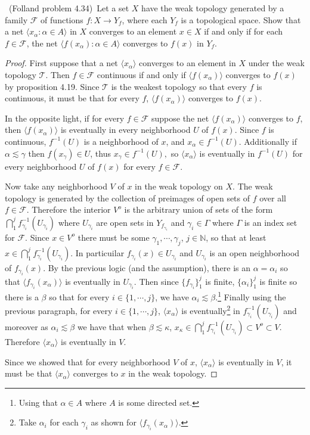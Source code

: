 \documentclass[11pt]{amsart}
\theoremstyle{definition}
\numberwithin{theorem}{section}
\numberwithin{definition}{section}
\numberwithin{equation}{section}
\newcommand{\abr}[1]{ \langle  #1 \rangle}
\def\scriptf{{\mathcal F}}
\def\scriptt{{\mathcal T}}
\begin{document}
\medskip {}\ (Folland problem 4.34)\ 
Let a set $X$ have the weak topology generated by a family $\scriptf$
of functions $f:X\to Y_f$, where each $Y_f$ is a topological space.
Show that a net $\abr{x_\alpha: \alpha\in A}$ in $X$ converges to an element $x\in X$
if and only if for each $f\in\scriptf$,
the net $\abr{f(x_\alpha): \alpha\in A}$ converges to $f(x)$ in $Y_f$.
\begin{proof}
	First suppose that a net $\abr{x_\alpha}$ converges to an element in $X$ under the weak topology $\scriptt$.
	Then $f \in \scriptf$ continuous if and only if $\abr{f(x_\alpha)}$ converges to $f(x)$ by proposition 4.19. Since
	$\scriptt$ is the weakest topology so that every $f$ is continuous, it must be that for every $f$, $\abr{f(x_\alpha)}$
	converges to $f(x).$

	In the opposite light, if for every $f \in \scriptf$ suppose the net $\abr{f(x_\alpha)}$ converges to $f$, then $\abr{f(x_\alpha)}$ is eventually in every neighborhood $U$ of $f(x).$ Since $f$ is continuous, $f^{-1}(U)$ is a neighborhood of $x$, and $x_\alpha \in f^{-1}(U)$. Additionally if $\alpha \lesssim \gamma$ then $f(x_\gamma) \in U$, thus $x_\gamma \in f^{-1}(U),$ so $\abr{x_\alpha}$ is eventually in $f^{-1}(U)$ for every neighborhood $U$ of $f(x)$ for every $f \in \scriptf$. 

	Now take any neighborhood $V$ of $x$ in the weak topology on $X$. The weak topology is generated by the collection of preimages of open sets of $f$ over all $f \in \scriptf$. Therefore the interior $V^o$ is the arbitrary union of sets of the form $\bigcap_{1}^j f_{\gamma_i}^{-1}(U_{\gamma_i})$ where $U_{\gamma_i}$ are open sets in $Y_{f_{\gamma_i}}$ and $\gamma_i \in \Gamma$ where $\Gamma$ is an index set for $\scriptf$. Since $x \in V^o$ there must be some $\gamma_1, \cdots, \gamma_j$, $j\in\mathbb{N}$, so that at least $x \in \bigcap_{1}^j  f_{\gamma_i}^{-1}(U_{\gamma_i}).$ In particuilar $f_{\gamma_i}(x) \in U_{\gamma_i}$ and $U_{\gamma_i}$ is an open neighborhood of $f_{\gamma_i}(x).$ By the previous logic (and the assumption), there is an $\alpha = \alpha_i$ so that $\abr{f_{\gamma_i}(x_\alpha)}$ is eventually in $U_{\gamma_i}.$ Then since $\{f_{\gamma_i}\}_1^j$ is finite, $\{\alpha_i\}_1^j$ is finite so there is a $\beta$ so that for every $i \in \{1, \cdots, j\}$, we have $\alpha_i \lesssim \beta.$\footnote{Using that $\alpha \in A$ where $A$ is some directed set.} Finally using the previous paragraph, for every $i\in \{1, \cdots, j\}$, $\abr{x_{\alpha}}$ is eventually\footnote{Take $\alpha_i$ for each $\gamma_i$ as shown for $\abr{f_{\gamma_i}(x_\alpha)}$.}  in $f_{\gamma_i}^{-1}(U_{\gamma_i})$ and moreover as $\alpha_i \lesssim \beta$ we have that when $\beta \lesssim \kappa$, $x_\kappa \in \bigcap_1^j f^{-1}_{\gamma_i}(U_{\gamma_i}) \subset V^o \subset V$. Therefore $\abr{x_\alpha}$ is eventually in $V$.

	Since we showed that for every neighborhood $V$ of $x$, $\abr{x_\alpha}$ is eventually in $V$, it must be that $\abr{x_\alpha}$ converges to $x$ in the weak topology.
\end{proof}
\end{document}
